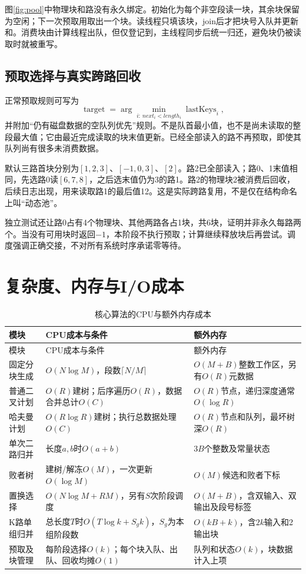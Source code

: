 图\ref{fig:pool}中物理块和路没有永久绑定。初始化为每个非空段读一块，其余块保留为空闲；下一次预取用取出一个块。读线程只填该块，join后才把块号入队并更新和。消费块由计算线程出队，但仅登记到，主线程同步后统一归还，避免块仍被读取时就被重写。

\subsection{预取选择与真实跨路回收}
正常预取规则可写为
\begin{equation}
\operatorname{target}=\arg\min_{i:\ next_i<length_i}\operatorname{lastKeys}_i,
\end{equation}
并附加“仍有磁盘数据的空队列优先”规则。不是队首最小值，也不是尚未读取的整段最大值；它由最近完成读取的块末值更新。已经全部读入的路不再预取，即使其队列尚有很多未消费数据。

默认三路首块分别为$[1,2,3]$、$[-1,0,3]$、$[2]$。路2已全部读入；路0、1末值相同，先选路0读$[6,7,8]$，之后选末值仍为3的路1。路2的物理块2被消费后回收，后续日志出现，用来读取路1的最后值12。这是实际跨路复用，不是仅在结构命名上叫“动态池”。

独立测试还让路0占有4个物理块、其他两路各占1块，共6块，证明并非永久每路两个。当没有可用块时返回$-1$，本阶段不执行预取；计算继续释放块后再尝试。调度强调正确交接，不对所有系统时序承诺零等待。

\section{复杂度、内存与I/O成本}
\begin{longtable}{p{35mm}p{61mm}p{51mm}}
\caption{核心算法的CPU与额外内存成本}\label{tab:complexity}\\\toprule
模块 & CPU成本与条件 & 额外内存\\\midrule\endfirsthead
\toprule 模块 & CPU成本与条件 & 额外内存\\\midrule\endhead
固定分块生成 & $O(N\log M)$，段数$\lceil N/M\rceil$ & $O(M+B)$整数工作区，另有$O(R)$元数据\\
普通二叉计划 & $O(R)$建树；后序遍历$O(R)$，数据合并总计$O(C)$ & $O(R)$节点，递归深度通常$O(\log R)$\\
哈夫曼计划 & $O(R\log R)$建树；执行总数据处理$O(C)$ & $O(R)$节点和队列，最坏树深$O(R)$\\
单次二路归并 & 长度$a,b$时$O(a+b)$ & $3B$个整数及常量状态\\
败者树 & 建树/解冻$O(M)$，一次更新$O(\log M)$ & $O(M)$候选和败者下标\\
置换选择 & $O(N\log M+RM)$，另有$S$次阶段调度 & $O(M+B)$，含双输入、双输出及段号标签\\
K路单组归并 & 总长度$T$时$O(T\log k+S_g k)$，$S_g$为本组阶段数 & $O(kB+k)$，含$2k$输入和2输出块\\
预取及块管理 & 每阶段选择$O(k)$；每个块入队、出队、回收均摊$O(1)$ & 队列和状态$O(k)$，块数据计入上项\\\bottomrule
\end{longtable}

